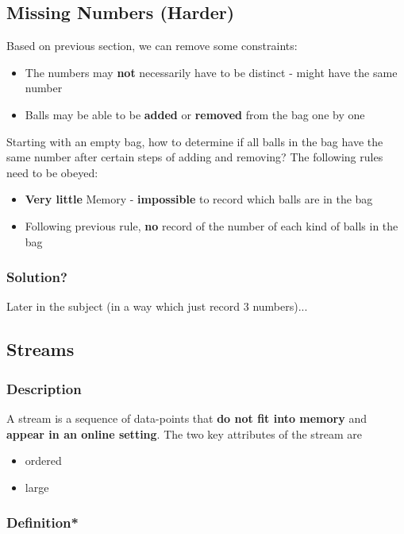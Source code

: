 \documentclass[a4paper]{article}
\begin{document}
\subsection{Missing Numbers (Harder)}

Based on previous section, we can remove some constraints:
\begin{itemize}
    \item The numbers may \textbf{not} necessarily have to be distinct - might have the same number
    \item Balls may be able to be \textbf{added} or \textbf{removed} from the bag one by one
\end{itemize}
Starting with an empty bag, how to determine if all balls in the bag have the same number after certain steps of adding and removing? The following rules need to be obeyed:
\begin{itemize}
    \item \textbf{Very little} Memory - \textbf{impossible} to record which balls are in the bag
    \item Following previous rule, \textbf{no} record of the number of each kind of balls in the bag
\end{itemize}

\subsubsection{Solution?}

Later in the subject (in a way which just record 3 numbers)...

\subsection{Streams}

\subsubsection{Description}

A stream is a sequence of data-points that \textbf{do not fit into memory} and \textbf{appear in an online setting}. The two key attributes of the stream are
\begin{itemize}
    \item ordered
    \item large
\end{itemize}

\subsubsection{Definition*}
\end{document}
